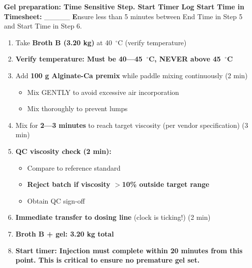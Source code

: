 {\textbf{Gel preparation: Time Sensitive Step. Start Timer}
\textbf{Log Start Time in Timesheet:} \_\_\_\_\_
\textbf Ensure less than 5 minutes between End Time in Step 5 and Start Time in Step 6. 
\begin{enumerate}[leftmargin=1.5em]
\item Take \textbf{Broth B (3.20 kg)} at 40~$^\circ$C (verify temperature)
\item \textbf{Verify temperature: Must be 40---45~$^\circ$C, NEVER above 45~$^\circ$C}
\item Add \textbf{100 g Alginate-Ca premix} while paddle mixing continuously (2 min)
  \begin{itemize}
  \item Mix GENTLY to avoid excessive air incorporation
  \item Mix thoroughly to prevent lumps
  \end{itemize}
\item Mix for \textbf{2---3 minutes} to reach target viscosity (per vendor specification) (3 min)
\item \textbf{QC viscosity check (2 min):}
  \begin{itemize}
  
\item Compare to reference standard
  \item \textbf{Reject batch if viscosity $>$10\% outside target range}
  \item Obtain QC sign-off
  \end{itemize}
\item \textbf{Immediate transfer to dosing line} (clock is ticking!) (2 min)
\item \textbf{Broth B + gel: 3.20 kg total}
\item \textbf{Start timer: Injection must complete within 20 minutes from this point.
This is critical to ensure no premature gel set.}
\end{enumerate}

}
